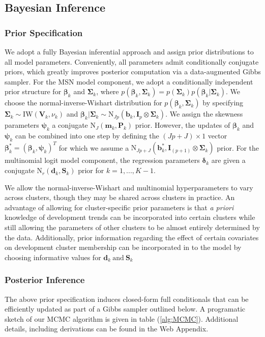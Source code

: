 \documentclass[useAMS,referee]{biom}
\begin{document}
\subsection{Bayesian Inference}

\subsubsection{Prior Specification}
We adopt a fully Bayesian inferential approach and assign prior distributions to all model parameters. Conveniently, all parameters admit conditionally conjugate priors, which greatly improves posterior computation via a data-augmented Gibbs sampler. For the MSN model component, we adopt a conditionally independent prior structure for $\boldsymbol\beta_k$ and $\boldsymbol\Sigma_k$, where $p(\boldsymbol\beta_k,\boldsymbol\Sigma_k) = p(\boldsymbol\Sigma_k)p(\boldsymbol\beta_k|\boldsymbol\Sigma_k)$. We choose the normal-inverse-Wishart distribution for $p(\boldsymbol\beta_k,\boldsymbol\Sigma_k)$ by specifying $\boldsymbol\Sigma_k \sim \text{IW}(\mathbf{V}_k,\nu_k)$ and $\boldsymbol\beta_k|\boldsymbol\Sigma_k \sim \text{N}_{Jp}(\mathbf{b}_k,\mathbf{I}_p \otimes \boldsymbol\Sigma_k)$. We assign the skewness parameters $\boldsymbol\psi_k$ a conjugate $\text{N}_J(\mathbf{m}_k,\mathbf{P}_k)$ prior. However, the updates of $\boldsymbol\beta_k$ and $\boldsymbol\psi_k$ can be combined into one step by defining the $(Jp + J) \times 1$ vector $\boldsymbol\beta^*_k = (\boldsymbol\beta_k,\boldsymbol\psi_k)^T$ for which we assume a $\text{N}_{Jp+J}(\mathbf{b}^*_k,\mathbf{I}_{(p+1)} \otimes \boldsymbol\Sigma_k)$ prior. For the multinomial logit model component, the regression parameters $\boldsymbol\delta_k$ are given a conjugate $\text{N}_r(\mathbf{d}_k, \mathbf{S}_k)$ prior for $k = 1,...,K-1$. 

We allow the normal-inverse-Wishart and multinomial hyperparameters to vary across clusters, though they may be shared across clusters in practice. An advantage of allowing for cluster-specific prior parameters is that \textit{a priori} knowledge of development trends can be incorporated into certain clusters while still allowing the parameters of other clusters to be almost entirely determined by the data. Additionally, prior information regarding the effect of certain covariates on development cluster membership can be incorporated in to the model by choosing informative values for $\mathbf{d}_k \ \text{and} \ \mathbf{S}_k$

\subsubsection{Posterior Inference} 
The above prior specification induces closed-form full conditionals that can be efficiently updated as part of a Gibbs sampler outlined below. A programatic sketch of our MCMC algorithm is given in table (\ref{alg:MCMC}). Additional details, including derivations can be found in the Web Appendix. 
\end{document}
